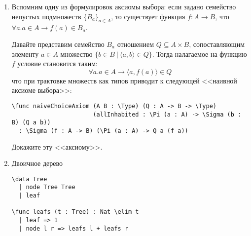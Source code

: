 \documentclass[10pt,a4paper,oneside]{article}
\begin{document}
\begin{enumerate}
\begin{verbatim}
\func five_eq_five : 5 = 5 => idp {Nat} {5}
\func proof4 : \Sigma (x : Nat) (x = 5) => (5, five_eq_five)
\end{verbatim}

Проверьте, какие из следующих утверждений доказуемы (и тогда постройте
соответствующее доказательство), а какие нет (и тогда опровергните их, тоже на Аренде): 

\begin{enumerate}
\item $(\exists x.\exists y.\phi) \rightarrow (\exists y.\exists x.\phi)$ и
$(\forall x.\forall y.\phi) \rightarrow (\forall y.\forall x.\phi)$
\item $(\forall x.\exists y.\phi) \rightarrow (\exists y.\forall x.\phi)$  и наоборот,
$(\exists y.\forall x.\phi) \rightarrow (\forall x.\exists y.\phi)$
\item $(\neg\forall x.\phi) \rightarrow (\exists x.\neg \phi)$ и в обратную сторону.
\end{enumerate}

\item Вспомним одну из формулировок аксиомы выбора: если задано семейство
непустых подмножеств $\{B_a\}_{a \in A}$, 
то существует функция $f: A \rightarrow B$, что $\forall a. a \in A \rightarrow f (a) \in B_a$.

Давайте представим семейство $B_a$ отношением $Q \subseteq A \times B$, 
сопоставляющим элементу $a \in A$ множество $\{ b \in B\ |\ \langle a,b \rangle \in Q\}$.
Тогда налагаемое на функцию $f$ условие становится таким:
$$\forall a.a \in A \rightarrow \langle a, f (a) \rangle \in Q$$
что при трактовке множеств как типов приводит к следующей <<наивной аксиоме выбора>>:

\begin{verbatim}
\func naiveChoiceAxiom (A B : \Type) (Q : A -> B -> \Type)
                       (allInhabited : \Pi (a : A) -> \Sigma (b : B) (Q a b))
  : \Sigma (f : A -> B) (\Pi (a : A) -> Q a (f a))
\end{verbatim}

Докажите эту <<аксиому>>.

\item Двоичное дерево

\begin{verbatim}
\data Tree
  | node Tree Tree
  | leaf

\func leafs (t : Tree) : Nat \elim t
  | leaf => 1
  | node l r => leafs l + leafs r
\end{verbatim}


\end{enumerate}
\end{document}
